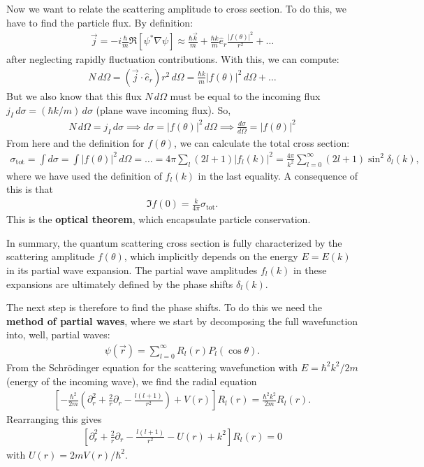 \documentclass{book}
\theoremstyle{definition}
\newcommand{\p}{\partial}
\newcommand{\f}[2]{\frac{#1}{#2}}
\newcommand{\lp}{\left(}
\newcommand{\rp}{\right)}
\newcommand{\lb}{\left[}
\newcommand{\rb}{\right]}
\begin{document}
Now we want to relate the scattering amplitude to cross section. To do this, we have to find the particle flux. By definition:
\begin{align*}
	\vec{j} = -i \f{\hbar}{m}\Re\lb \psi^* \nabla \psi \rb \approx \f{\hbar \vec{k}}{m} + \f{\hbar k}{m}\hat{e}_r \f{|f(\theta)|^2}{r^2} + \dots
\end{align*}
after neglecting rapidly fluctuation contributions. With this, we can compute:
\begin{align*}
	N\,d\Omega = (\vec{j}\cdot \hat{e}_r) r^2\,d\Omega = \f{\hbar k}{m} |f(\theta)|^2\,d\Omega + \dots 
\end{align*}
But we also know that this flux $N\,d\Omega$ must be equal to the incoming flux $j_I \,d\sigma = (\hbar k/m)\,d\sigma$ (plane wave incoming flux). So,
\begin{align*}
	N\,d\Omega = j_I \,d\sigma \implies d\sigma = |f(\theta)|^2\,d\Omega \implies \boxed{ {\f{d\sigma}{d\Omega} = |f(\theta)|^2}}
\end{align*}
From here and the definition for $f(\theta)$, we can calculate the total cross section:
\begin{align*}
	\sigma_\text{tot} = \int d\sigma = \int |f(\theta)|^2\, d\Omega = \dots = 4\pi \sum_{l}(2l+1) |f_l(k)|^2 = \f{4\pi}{k^2}\sum_{l=0}^\infty (2l+1)\sin^2\delta_l(k),
\end{align*}
where we have used the definition of $f_l(k)$ in the last equality. A consequence of this is that
\begin{align*}
	\Im f(0) = \f{k}{4\pi} \sigma_\text{tot}.
\end{align*}
This is the \textbf{optical theorem}, which encapsulate particle conservation.

\begin{framed}
	In summary, the quantum scattering cross section is fully characterized by the scattering amplitude $f(\theta)$, which implicitly depends on the energy $E=E(k)$ in its partial wave expansion. The partial wave amplitudes $f_l(k)$ in these expansions are ultimately defined by the phase shifts $\delta_l(k)$.
\end{framed}


The next step is therefore to find the phase shifts.  To do this we need the \textbf{method of partial waves}, where we start by decomposing the full wavefunction into, well, partial waves:
\begin{align*}
	\psi(\vec{r}) = \sum_{l=0}^\infty R_l(r) P_l(\cos\theta). 
\end{align*}
From the Schr\"{o}dinger equation for the scattering wavefunction with $E = \hbar^2 k^2 / 2m$ (energy of the incoming wave), we find the radial equation
\begin{align*}
	\lb -\f{\hbar^2}{2m}\lp \p_r^2 + \f{2}{r}\p_r - \f{l(l+1)}{r^2} \rp + V(r) \rb R_l(r) = \f{\hbar^2 k^2}{2m} R_l(r).
\end{align*}
Rearranging this gives
\begin{align*}
	\lb \p_r^2 + \f{2}{r}\p_r - \f{l(l+1)}{r^2} - U(r) + k^2 \rb R_l(r) = 0
\end{align*}
with $U(r) = 2mV(r)/\hbar^2$.\\
\end{document}
